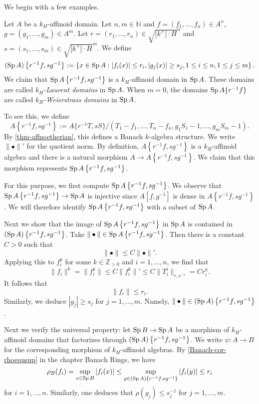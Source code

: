 We begin with a few examples.
\begin{example}\label{ex-Laurentdomain}
    Let $A$ be a $k_H$-affinoid domain.
    Let $n,m\in \mathbb{N}$ and $f=(f_1,\ldots,f_n)\in A^n$, $g=(g_1,\ldots,g_m)\in A^m$. Let $r=(r_1,\ldots,r_n)\in\sqrt{|k^{\times}|\cdot H}^n$ and $s=(s_1,\ldots,s_m)\in \sqrt{|k^{\times}|\cdot H}^m$. We define
    \[
        (\operatorname{Sp} A)\left\{r^{-1}f,sg^{-1}\right\}:=\left\{x\in \operatorname{Sp} A: |f_i(x)|\leq r_i, |g_j(x)|\geq s_j, 1\leq i\leq n, 1\leq j\leq m\right\}.  
    \]
    We claim that $\operatorname{Sp} A\left\{r^{-1}f,sg^{-1}\right\}$ is a $k_H$-affinoid domain in $\operatorname{Sp} A$. These domains are called \emph{$k_H$-Laurent domains} in $\operatorname{Sp} A$. When $m=0$, the domains $\operatorname{Sp} A\{r^{-1}f\}$ are called \emph{$k_H$-Weierstrass domains} in $\operatorname{Sp} A$.

    To see this, we define
    \[
        A\left\{r^{-1}f,sg^{-1}\right\}:=A\{r^{-1}T,sS\}/(T_1-f_1,\ldots,T_n-f_n,g_1S_1-1,\ldots,g_mS_m-1).
    \]
    By \cref{thm-affnoetherian}, this defines a Banach $k$-algebra structure.
    We write $\|\bullet\|'$ for the quotient norm.
    By definition, $A\left\{r^{-1}f,sg^{-1}\right\}$ is a $k_H$-affinoid algebra and there is a natural morphism $A\rightarrow A\left\{r^{-1}f,sg^{-1}\right\}$. We claim that this morphism represents $\operatorname{Sp} A\left\{r^{-1}f,sg^{-1}\right\}$.

    For this purpose, we first compute $\operatorname{Sp} A\left\{r^{-1}f,sg^{-1}\right\}$. We observe that $\operatorname{Sp} A\left\{r^{-1}f,sg^{-1}\right\}\rightarrow \operatorname{Sp} A$ is injective since
    $A[f,g^{-1}]$ is dense in $A\left\{r^{-1}f,sg^{-1}\right\}$. We will therefore identify $\operatorname{Sp} A\left\{r^{-1}f,sg^{-1}\right\}$ with a subset of $\operatorname{Sp} A$. 
    
    Next we show that the image of $\operatorname{Sp} A\left\{r^{-1}f,sg^{-1}\right\}$ in $\operatorname{Sp} A$ is contained in $(\operatorname{Sp} A)\left\{r^{-1}f,sg^{-1}\right\}$. Take $\|\bullet\|\in \operatorname{Sp} A\left\{r^{-1}f,sg^{-1}\right\}$. Then there is a constant $C>0$ such that
    \[
        \|\bullet\|\leq C\|\bullet\|'.  
    \]
    Applying this to $f^k_i$ for some $k\in \mathbb{Z}_{>0}$ and $i=1,\ldots,n$, we find that
    \[
        \|f_i\|^k=\|f_i^k\|\leq C\|f_i^k\|'\leq C\|T_i^i\|_{r,s^{-1}}= Cr_i^{k}.  
    \]
    It follows that 
    \[
        \|f_i\|\leq r_i.
    \]
    Similarly, we deduce $|g_j|\geq s_j$ for $j=1,\ldots,m$. Namely, $\|\bullet\|\in (\operatorname{Sp} A)\left\{r^{-1}f,sg^{-1}\right\}$.


    Next we verify the universal property: let $\operatorname{Sp} B\rightarrow \operatorname{Sp} A$ be a morphism of $k_H$-affinoid domains that factorizes through $(\operatorname{Sp} A)\left\{r^{-1}f,sg^{-1}\right\}$. We write $\psi:A\rightarrow B$ for the corresponding morphism of $k_H$-affinoid algebras.
    By \cref{Banach-cor-rhoequsup} in the chapter Banach Rings, we have
    \[
        \rho_B(f_i)=\sup_{x\in \operatorname{Sp} B}|f_i(x)|\leq \sup_{y\in (\operatorname{Sp} A)\left\{r^{-1}f,sg^{-1}\right\}} |f_i(y)|\leq r_i
    \]   
    for $i=1,\ldots,n$. Similarly, one deduces that $\rho(g_j)\leq s_j^{-1}$ for $j=1,\ldots,m$.
    

\end{example}
